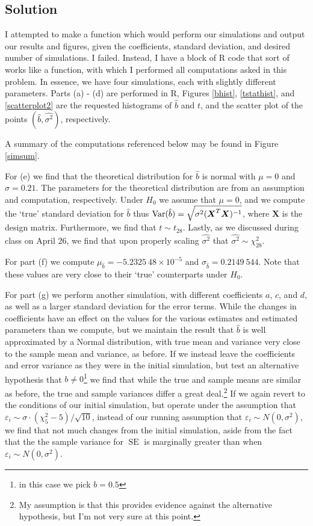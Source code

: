 \documentclass{amsart}
\DeclareMathOperator{\SE}{\text{SE}}
\newcommand{\var}{{\rm Var}}
\newcommand{\ep}{\varepsilon}
\newcommand{\bvec}[1]{{\boldsymbol #1}}
\begin{document}
		\subsection{Solution} %
		\label{sub:solution2}
			I attempted to make a function which would perform our simulations and output our results and figures, given the coefficients, standard deviation, and desired number of simulations.
			I failed.
			Instead, I have a block of R code that sort of works like a function, with which I performed all computations asked in this problem.
			In essence, we have four simulations, each with slightly different parameters.
			Parts (a) - (d) are performed in R, Figures \ref{bhist}, \ref{tstathist}, and \ref{scatterplot2} are the requested histograms of $\hat{b}$ and $t$, and the scatter plot of the points $\left( \hat{b}, \hat{\sigma^{2}} \right)$, respectively.

			A summary of the computations referenced below may be found in Figure \ref{simsum}.

			For (e) we find that the theoretical distribution for $\hat{b}$ is normal with $\mu = 0$ and $\sigma = 0.21$.
			The parameters for the theoretical distribution are from an assumption and computation, respectively.
			Under $H_{0}$ we assume that $\mu = 0$, and we compute the `true' standard deviation for $\hat{b}$ thus $\var(\hat{b}) = \sqrt{\sigma^{2}(\bvec{X}^{T}\bvec{X})^{-1}}$, where $\bvec{X}$ is the design matrix.
			Furthermore, we find that $t \sim t_{28}$. 
			Lastly, as we discussed during class on April 26, we find that upon properly scaling $\hat{\sigma^{2}}$ that $\hat{\sigma^{2}} \sim \chi_{28}^{2}$.
			
			For part (f) we compute $\mu_{\hat{b}} = -5.2325 \ 48 \times 10^{-5}$ and $\sigma_{\hat{b}} = 0.2149 \ 544$.
			Note that these values are very close to their `true' counterparts under $H_{0}$.

			For part (g) we perform another simulation, with different coefficients $a$, $c$, and $d$, as well as a larger standard deviation for the error terms.
			While the changes in coefficients have an effect on the values for the various estimates and estimated parameters than we compute, but we maintain the result that $\hat{b}$ is well approximated by a Normal distribution, with true mean and variance very close to the sample mean and variance, as before.
			If we instead leave the coefficients and error variance as they were in the initial simulation, but test an alternative hypothesis that $b \neq 0$\footnote{in this case we pick $b = 0.5$} we find that while the true and sample means are similar as before, the true and sample variances differ a great deal.\footnote{My assumption is that this provides evidence against the alternative hypothesis, but I'm not very sure at this point.}
			If we again revert to the conditions of our initial simulation, but operate under the assumption that $\ep_{i} \sim \sigma \cdot \left( \chi_{5}^{2} - 5 \right)/\sqrt{10}$, instead of our running assumption that $\ep_{i} \sim N(0, \sigma^{2})$, we find that not much changes from the initial simulation, aside from the fact that the the sample variance for $\SE$ is marginally greater than when $\ep_{i} \sim N(0, \sigma^{2})$.
\end{document}
